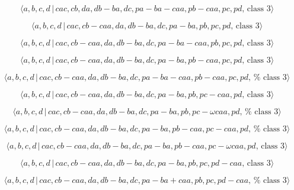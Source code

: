 \documentclass[10pt]{article}
\begin{document}
\begin{equation}
\langle a,b,c,d\,|\,cac,cb,da,db-ba,dc,pa-ba-caa,pb-caa,pc,pd,\,\text{class }%
3\rangle  \tag{7.4165}
\end{equation}

\begin{equation}
\langle a,b,c,d\,|\,cac,cb-caa,da,db-ba,dc,pa-ba,pb,pc,pd,\,\text{class }%
3\rangle  \tag{7.4166}
\end{equation}

\begin{equation}
\langle a,b,c,d\,|\,cac,cb-caa,da,db-ba,dc,pa-ba-caa,pb,pc,pd,\,\text{class }%
3\rangle  \tag{7.4167}
\end{equation}

\begin{equation}
\langle a,b,c,d\,|\,cac,cb-caa,da,db-ba,dc,pa-ba,pb-caa,pc,pd,\,\text{class }%
3\rangle  \tag{7.4168}
\end{equation}

\begin{equation}
\langle a,b,c,d\,|\,cac,cb-caa,da,db-ba,dc,pa-ba-caa,pb-caa,pc,pd,\,\text{%
class }3\rangle  \tag{7.4169}
\end{equation}

\begin{equation}
\langle a,b,c,d\,|\,cac,cb-caa,da,db-ba,dc,pa-ba,pb,pc-caa,pd,\,\text{class }%
3\rangle  \tag{7.4170}
\end{equation}

\begin{equation}
\langle a,b,c,d\,|\,cac,cb-caa,da,db-ba,dc,pa-ba,pb,pc-\omega caa,pd,\,\text{%
class }3\rangle  \tag{7.4171}
\end{equation}

\begin{equation}
\langle a,b,c,d\,|\,cac,cb-caa,da,db-ba,dc,pa-ba,pb-caa,pc-caa,pd,\,\text{%
class }3\rangle  \tag{7.4172}
\end{equation}

\begin{equation}
\langle a,b,c,d\,|\,cac,cb-caa,da,db-ba,dc,pa-ba,pb-caa,pc-\omega caa,pd,\,%
\text{class }3\rangle  \tag{7.4173}
\end{equation}

\begin{equation}
\langle a,b,c,d\,|\,cac,cb-caa,da,db-ba,dc,pa-ba,pb,pc,pd-caa,\,\text{class }%
3\rangle  \tag{7.4174}
\end{equation}

\begin{equation}
\langle a,b,c,d\,|\,cac,cb-caa,da,db-ba,dc,pa-ba+caa,pb,pc,pd-caa,\,\text{%
class }3\rangle  \tag{7.4175}
\end{equation}
\end{document}
